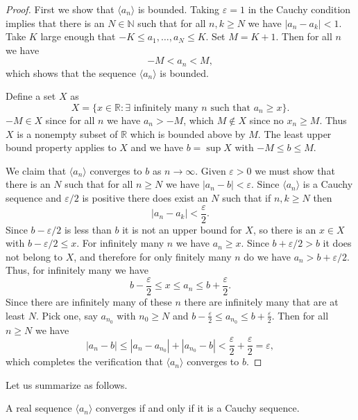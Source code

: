 \begin{proof}
  First we show that $\langle a_n \rangle$ is bounded.
  Taking $\varepsilon = 1$ in the Cauchy condition implies that there is an $N \in \mathbb{N}$ such that for all $n, k \geqslant N$ we have $|a_n - a_k| < 1$.
  Take $K$ large enough that $-K \leqslant a_1, \dots, a_N \leqslant K$.
  Set $M = K + 1$.  Then for all $n$ we have
  \[
    -M < a_n < M,
  \]
  which shows that the sequence $\langle a_n \rangle$ is bounded.

  Define a set $X$ as 
  \[
    X = \{ x \in \mathbb{R} \colon \exists\,\, \text{infinitely many $n$ such that } a_n \geqslant x \}.
  \]
  $-M \in X$ since for all $n$ we have $a_n > -M$, which $M \notin X$ since no $x_n \geqslant M$.  Thus $X$ is a nonempty subset of $\mathbb{R}$ which is bounded above by $M$.  The least upper bound property applies to $X$ and we have $b = \sup X$ with $-M \leqslant b \leqslant M$.

  We claim that $\langle a_n \rangle$ converges to $b$ as $n \to \infty$.
  Given $\varepsilon > 0$ we must show that there is an $N$ such that for all $n \geqslant N$ we have $|a_n - b| < \varepsilon$.
  Since $\langle a_n \rangle$ is a Cauchy sequence and $\varepsilon/2$ is positive there does exist an $N$ such that if $n, k \geqslant N$ then
  \[
    |a_n - a_k| < \frac{\varepsilon}{2}.
  \]
  Since $b - \varepsilon/2$ is less than $b$ it is not an upper bound for $X$, so there is an $x \in X$ with $b - \varepsilon/2 \leqslant x$.
  For infinitely many $n$ we have $a_n \geqslant x$.
  Since $b + \varepsilon/2 > b$ it does not belong to $X$, and therefore for only finitely many $n$ do we have $a_n > b + \varepsilon/2$.
  Thus, for infinitely many we have
  \[
    b - \frac{\varepsilon}{2} \leqslant x \leqslant a_n \leqslant b + \frac{\varepsilon}{2}.
  \]
  Since there are infinitely many of these $n$ there are infinitely many that are at least $N$.  Pick one, say $a_{n_0}$ with $n_0 \geqslant N$ and $b - \frac{\varepsilon}{2} \leqslant a_{n_0} \leqslant b + \frac{\varepsilon}{2}$.  Then for all $n \geqslant N$ we have
  \[
    |a_n - b| \leqslant |a_n - a_{n_0}| + |a_{n_0} - b| < \frac{\varepsilon}{2} + \frac{\varepsilon}{2} = \varepsilon,
  \]
  which completes the verification that $\langle a_n \rangle$ converges to $b$.
\end{proof}

Let us summarize as follows.
\begin{thm}
  A real sequence $\langle a_n \rangle$ converges if and only if it is a Cauchy sequence.
\end{thm}

